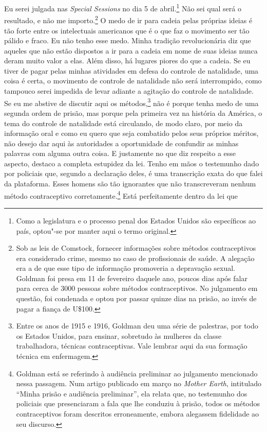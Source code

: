 Eu serei julgada nas \emph{Special Sessions} no dia 5 de
abril.\footnote{Como a legislatura e o processo penal dos Estados Unidos
  são específicos ao país, optou"-se por manter aqui o termo original.}
Não sei qual será o resultado, e não me importo.\footnote{Sob as leis de
  Comstock, fornecer informações sobre métodos contraceptivos era
  considerado crime, mesmo no caso de profissionais de saúde. A alegação
  era a de que esse tipo de informação promoveria a depravação sexual.
  Goldman foi presa em 11 de fevereiro daquele ano, poucos dias após
  falar para cerca de 3000 pessoas sobre métodos contraceptivos. No
  julgamento em questão, foi condenada e optou por passar quinze dias na
  prisão, ao invés de pagar a fiança de U\$100.} O medo de ir para
cadeia pelas próprias ideias é tão forte entre os intelectuais
americanos que é o que faz o movimento ser tão pálido e fraco. Eu não
tenho esse medo. Minha tradição revolucionária diz que aqueles que não
estão dispostos a ir para a cadeia em nome de suas ideias nunca deram
muito valor a elas. Além disso, há lugares piores do que a cadeia. Se eu
tiver de pagar pelas minhas atividades em defesa do controle de
natalidade, uma coisa é certa, o movimento de controle de natalidade não
será interrompido, como tampouco serei impedida de levar adiante a
agitação do controle de natalidade. Se eu me abstive de discutir aqui os
métodos,\footnote{Entre os anos de 1915 e 1916, Goldman deu uma série de
  palestras, por todo os Estados Unidos, para ensinar, sobretudo às
  mulheres da classe trabalhadora, técnicas contraceptivas. Vale lembrar
  aqui da sua formação técnica em enfermagem.} não é porque tenha medo
de uma segunda ordem de prisão, mas porque pela primeira vez na história
da América, o tema do controle de natalidade está circulando, de modo
claro, por meio da informação oral e como eu quero que seja combatido
pelos seus próprios méritos, não desejo dar aqui às autoridades a
oportunidade de confundir as minhas palavras com alguma outra coisa.
E justamente no que diz respeito a esse aspecto, destaco
a completa estupidez da lei. Tenho em
mãos o testemunho dado por policiais que, segundo a declaração deles, é
uma transcrição exata do que falei da plataforma. Esses homens são tão
ignorantes que não transcreveram nenhum método contraceptivo
corretamente.\footnote{Goldman está se referindo à audiência
  preliminar ao julgamento mencionado nessa passagem.
  Num artigo publicado em março no
  \emph{Mother Earth}, intitulado ``Minha prisão e audiência
  preliminar'', ela relata que, no testemunho dos policiais que
  presenciaram a fala que lhe conduziu à prisão, todos os métodos
  contraceptivos foram descritos erroneamente, embora alegassem
  fidelidade ao seu discurso.} Está perfeitamente dentro da lei que
